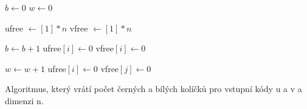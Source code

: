 \begin{algorithm}
\begin{algorithmic}[1]  %
    \State $b \gets 0$
    \State $w \gets 0$
    
    \State ufree $ \gets [1]*n$ 
    \State vfree $ \gets [1]*n$
    
          \State $b \gets b+1$ 
          \State ufree$[i]  \gets 0$
          \State vfree$[i] \gets 0$
        \EndIf
    \EndFor

    
              \State $w \gets w+1$ 
              \State ufree$[i]  \gets 0$
              \State vfree$[j] \gets 0$
            \EndIf
            \EndFor
    \EndIf
    \EndFor
	
\EndFunction
\end{algorithmic}
\caption{Algoritmus, který vrátí počet černých a bílých kolíčků pro vstupní kódy u a v a dimenzi n.}
\label{isprime}
\end{algorithm}
